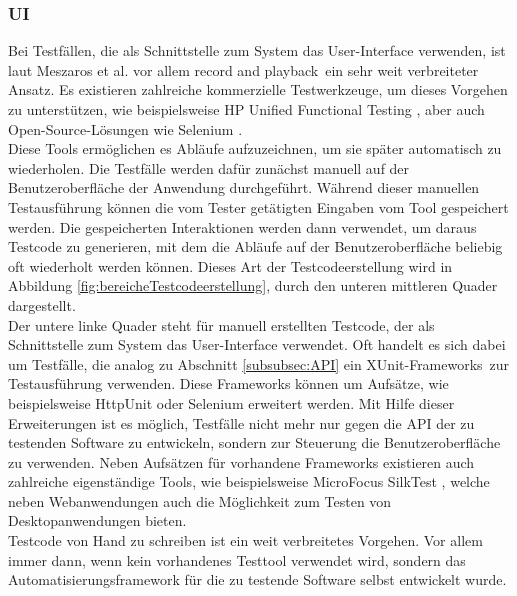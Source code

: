 \subsubsection{UI}
\label{subsubsec:UI}
Bei Testfällen, die als Schnittstelle zum System das User-Interface verwenden, ist laut  Meszaros et al. \cite{meszaros_agile_2003} vor allem \grq record and playback\grq\ ein sehr weit verbreiteter Ansatz. Es existieren zahlreiche kommerzielle Testwerkzeuge, um dieses Vorgehen zu unterstützen, wie beispielsweise HP Unified Functional Testing \cite{hp_testautomatisierung_2015}, aber auch Open-Source-Lösungen wie Selenium \cite{selenium_selenium_2015}.\\
Diese Tools ermöglichen es Abläufe aufzuzeichnen, um sie später automatisch zu wiederholen. Die Testfälle werden dafür zunächst manuell auf der Benutzeroberfläche der Anwendung durchgeführt. Während dieser manuellen Testausführung können die vom Tester getätigten Eingaben vom Tool gespeichert werden. Die gespeicherten Interaktionen werden dann verwendet, um daraus Testcode zu generieren, mit dem die Abläufe auf der Benutzeroberfläche beliebig oft wiederholt werden können. Dieses Art der Testcodeerstellung wird in Abbildung \ref{fig:bereicheTestcodeerstellung}, durch den unteren mittleren Quader dargestellt.\\
Der untere linke Quader steht für manuell erstellten Testcode, der als Schnittstelle zum System das User-Interface verwendet. Oft handelt es sich dabei um Testfälle, die analog zu Abschnitt \ref{subsubsec:API} ein \grq XUnit-Frameworks\grq\ zur Testausführung verwenden. Diese Frameworks können um Aufsätze, wie beispielsweise HttpUnit \cite{httpunit_httpunit_2015} oder Selenium \cite{selenium_selenium_2015} erweitert werden. Mit Hilfe dieser Erweiterungen ist es möglich, Testfälle nicht mehr nur gegen die API der zu testenden Software zu entwickeln, sondern zur Steuerung die Benutzeroberfläche zu verwenden. Neben Aufsätzen für vorhandene Frameworks existieren auch zahlreiche eigenständige Tools, wie beispielsweise MicroFocus SilkTest \cite{silk_test_borland_2015}, welche neben Webanwendungen auch die Möglichkeit zum Testen von Desktopanwendungen bieten.\\
Testcode von Hand zu schreiben ist ein weit verbreitetes Vorgehen. Vor allem immer dann, wenn kein vorhandenes Testtool verwendet wird, sondern das Automatisierungsframework für die zu testende Software selbst entwickelt wurde.


